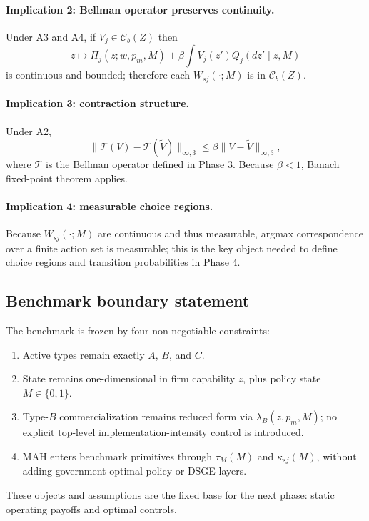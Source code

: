 \paragraph{Implication 2: Bellman operator preserves continuity.}
Under A3 and A4, if $V_j\in\mathcal C_b(Z)$ then
\[
z\mapsto \Pi_j(z;w,p_m,M)+\beta\int V_j(z')Q_j(dz'\mid z,M)
\]
is continuous and bounded; therefore each $W_{sj}(\cdot;M)$ is in $\mathcal C_b(Z)$.

\paragraph{Implication 3: contraction structure.}
Under A2,
\[
\|\mathcal T(V)-\mathcal T(\tilde V)\|_{\infty,3}
\le
\beta\|V-\tilde V\|_{\infty,3},
\]
where $\mathcal T$ is the Bellman operator defined in Phase 3. Because $\beta<1$, Banach fixed-point theorem applies.

\paragraph{Implication 4: measurable choice regions.}
Because $W_{sj}(\cdot;M)$ are continuous and thus measurable, argmax correspondence over a finite action set is measurable; this is the key object needed to define choice regions and transition probabilities in Phase 4.

\subsection{Benchmark boundary statement}

The benchmark is frozen by four non-negotiable constraints:
\begin{enumerate}
    \item Active types remain exactly $A$, $B$, and $C$.
    \item State remains one-dimensional in firm capability $z$, plus policy state $M\in\{0,1\}$.
    \item Type-$B$ commercialization remains reduced form via $\lambda_B(z,p_m,M)$; no explicit top-level implementation-intensity control is introduced.
    \item MAH enters benchmark primitives through $\tau_M(M)$ and $\kappa_{sj}(M)$, without adding government-optimal-policy or DSGE layers.
\end{enumerate}

These objects and assumptions are the fixed base for the next phase: static operating payoffs and optimal controls.
